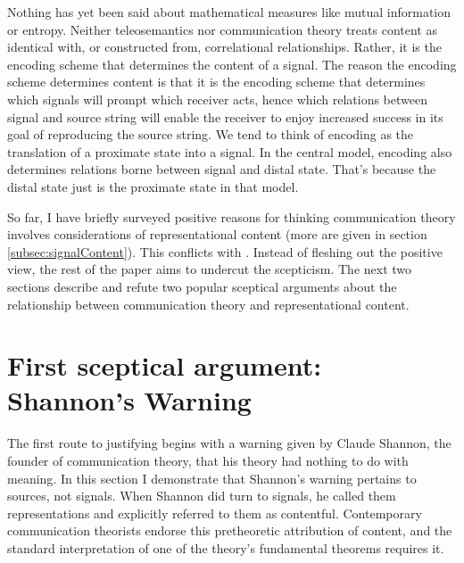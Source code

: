 \documentclass[12pt]{article}
\begin{document}
Nothing has yet been said about mathematical measures like mutual information or entropy.
Neither teleosemantics nor communication theory treats content as identical with, or constructed from, correlational relationships.
Rather, it is the encoding scheme that determines the content of a signal.
The reason the encoding scheme determines content is that it is the encoding scheme that determines which signals will prompt which receiver acts, hence which relations between signal and source string will enable the receiver to enjoy increased success in its goal of reproducing the source string.
We tend to think of encoding as the translation of a proximate state into a signal.
In the central model, encoding also determines relations borne between signal and distal state.
That's because the distal state just is the proximate state in that model.

So far, I have briefly surveyed positive reasons for thinking communication theory involves considerations of representational content (more are given in section \ref{subsec:signalContent}).
This conflicts with \tic{}.
Instead of fleshing out the positive view, the rest of the paper aims to undercut the scepticism.
The next two sections describe and refute two popular sceptical arguments about the relationship between communication theory and representational content.



\section{First sceptical argument: Shannon's Warning}\label{sec:warning}

The first route to justifying \tic{} begins with a warning given by Claude Shannon, the founder of communication theory, that his theory had nothing to do with meaning.
In this section I demonstrate that Shannon's warning pertains to sources, not signals.
When Shannon did turn to signals, he called them representations and explicitly referred to them as contentful.
Contemporary communication theorists endorse this pretheoretic attribution of content, and the standard interpretation of one of the theory's fundamental theorems requires it.


\end{document}
